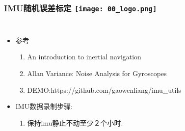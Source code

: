 

\begin{comment}
\end{comment}
\begin{frame}
\frametitle{IMU随机误差标定 \hfill \texttt{[image: 00\_logo.png]}}
\begin{columns}
  
  

  \begin{itemize}
    \item 参考
    \begin{enumerate}
      \item An introduction to inertial navigation
      \item Allan Variance: Noise Analysis for Gyroscopes
      \item DEMO:https://github.com/gaowenliang/imu\_utils
    \end{enumerate}

    \item IMU数据录制步骤:
    \begin{enumerate}
      \item 保持imu静止不动至少２个小时.
    \end{enumerate}
    
  \end{itemize}
  

\end{columns}
\end{frame} 




  
